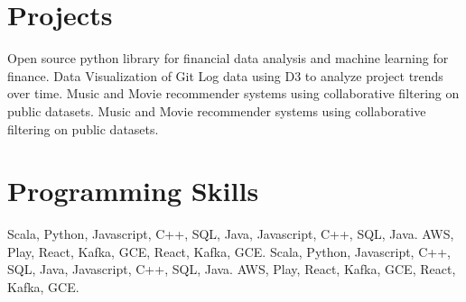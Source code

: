 

\section{Projects}
  \resumeSubHeadingListStart
      {Open source python library for financial data analysis and machine learning for finance.}
      {Data Visualization of Git Log data using D3 to analyze project trends over time.}
      {Music and Movie recommender systems using collaborative filtering on public datasets.}
      {Music and Movie recommender systems using collaborative filtering on public datasets.}
  \resumeSubHeadingListEnd


\section{Programming Skills}
 \resumeSubHeadingListStart
    {Scala, Python, Javascript, C++, SQL, Java, Javascript, C++, SQL, Java.}
    {AWS, Play, React, Kafka, GCE, React, Kafka, GCE.}
    {Scala, Python, Javascript, C++, SQL, Java, Javascript, C++, SQL, Java.}
    {AWS, Play, React, Kafka, GCE, React, Kafka, GCE.}
 \resumeSubHeadingListEnd

